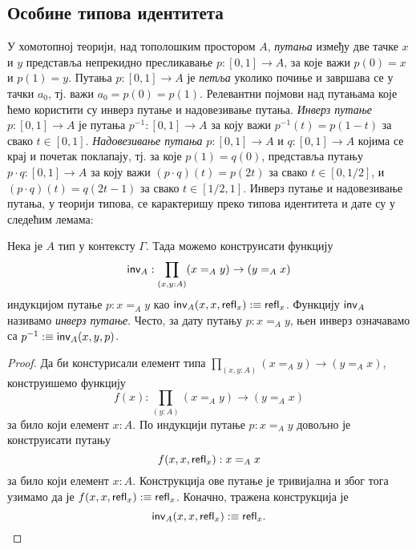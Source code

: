\documentclass[12pt,oneside]{memoir}
\begin{document}
\subsection{Особине типова идентитета}

У хомотопној теорији, над тополошким простором $A$, \emph{путања} између две тачке $x$ и $y$ представља непрекидно пресликавање $p : [0, 1] \to A$, за које важи $p(0) = x$ и $p(1) = y$. Путања $p : [0, 1] \to A$ је \emph{петља} уколико почиње и завршава се у тачки $a_0$, тј. важи $a_0 = p(0) = p(1)$. Релевантни појмови над путањама које ћемо користити су инверз путање и надовезивање путања. \emph{Инверз путање} $p : [0, 1] \to A$ је путања $p^{-1} : [0, 1] \to A$ за коју важи $p^{-1} (t) = p (1 - t)$ за свако $t \in [0, 1]$. \emph{Надовезивање путања} $p : [0, 1] \to A$ и $q : [0, 1] \to A$ којима се крај и почетак поклапају, тј. за које $p(1) = q(0)$, представља путању $p \cdot q : [0, 1] \to A$ за коју важи $(p \cdot q) (t) = p(2t)$ за свако $t \in [0, 1/2]$, и $(p \cdot q) (t) = q(2t - 1)$ за свако $t \in [1/2, 1]$. Инверз путање и надовезивање путања, у теорији типова, се карактеришу преко типова идентитета и дате су у следећим лемама:

\begin{lemma}
    Нека је $A$ тип у контексту $\Gamma$. Тада можемо конструисати функцију \[\mathsf{inv}_{A} : \prod_{(x, y : A)} (x =_A y) \to (y =_A x)\] индукцијом путање $p : x =_A y$ као $\mathsf{inv}_{A} (x, x, \mathsf{refl}_{x}) :\equiv \mathsf{refl}_{x}$. Функцију $\mathsf{inv}_{A}$ називамо \emph{инверз путање}. Често, за дату путању $p : x =_A y$, њен инверз означавамо са $p^{-1} :\equiv \mathsf{inv}_{A}(x, y, p)$.
\end{lemma}
\begin{proof}
    Да би констурисали елемент типа $\prod_{(x,y : A)} (x =_A y) \to (y =_A x)$, конструишемо функцију \[ f(x) : \prod_{(y : A)} (x =_A y) \to (y =_A x)\] за било који елемент $x : A$. По индукцији путање $p : x =_A y$ довољно је конструисати путању \[ f(x, x, \mathsf{refl}_{x}) : x =_A x \] за било који елемент $x : A$. Конструкција ове путање је тривијална и због тога узимамо да је $f (x, x, \mathsf{refl}_{x}) :\equiv \mathsf{refl}_{x}$. Коначно, тражена конструкција је \[ \mathsf{inv}_{A} (x, x, \mathsf{refl}_{x}) :\equiv \mathsf{refl}_{x}. \] 
\end{proof}
\end{document}
